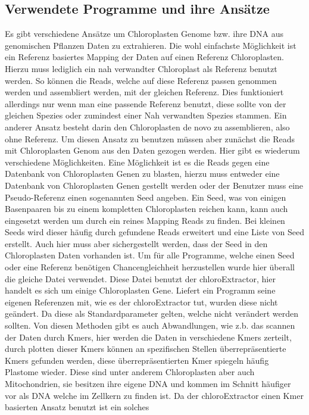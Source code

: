 \documentclass{scrartcl}
\begin{document}
\subsection{Verwendete Programme und ihre Ansätze}
\label{sec-2-5}
Es gibt verschiedene Ansätze um Chloroplasten Genome bzw. ihre DNA aus genomischen Pflanzen Daten zu extrahieren. Die wohl einfachste Möglichkeit ist ein Referenz basiertes
Mapping der Daten auf einen Referenz Chloroplasten. Hierzu muss lediglich ein nah verwandter Chloroplast als Referenz benutzt werden. So können die Reads, welche auf diese Referenz
passen genommen werden und assembliert werden, mit der gleichen Referenz. Dies funktioniert allerdings nur wenn man eine passende Referenz benutzt, diese sollte von der gleichen Spezies oder
zumindest einer Nah verwandten Spezies stammen. Ein anderer Ansatz besteht darin den Chloroplasten de novo zu assemblieren, also ohne Referenz. Um diesen Ansatz zu benutzen müssen
aber zunächst die Reads mit Chloroplasten Genom aus den Daten gezogen werden. Hier gibt es wiederum verschiedene Möglichkeiten. Eine Möglichkeit ist es die Reads gegen eine Datenbank
von Chloroplasten Genen zu blasten, hierzu muss entweder eine Datenbank von Chloroplasten Genen gestellt werden oder der Benutzer muss eine Pseudo-Referenz einen sogenannten Seed angeben.
Ein Seed, was von einigen Basenpaaren bis zu einem kompletten Chloroplasten reichen kann, kann auch eingesetzt werden um durch ein reines Mapping Reads zu finden. Bei kleinen Seeds wird dieser
häufig durch gefundene Reads erweitert und eine Liste von Seed erstellt. Auch hier muss aber sichergestellt werden, dass der Seed in den Chloroplasten Daten vorhanden ist.
Um für alle Programme, welche einen Seed oder eine Referenz benötigen Chancengleichheit herzustellen wurde hier überall die gleiche Datei verwendet. Diese Datei benutzt der chloroExtractor, 
hier handelt es sich um einige Chloroplasten Gene. Liefert ein Programm seine eigenen Referenzen mit, wie es der chloroExtractor tut, wurden diese nicht geändert. Da diese als Standardparameter 
gelten, welche nicht verändert werden sollten.
Von diesen Methoden gibt es auch Abwandlungen, wie z.b. das scannen der Daten durch Kmers, hier werden die Daten in verschiedene Kmers zerteilt, durch plotten dieser Kmers können
an spezifischen Stellen überrepräsentierte Kmers gefunden werden, diese überrepräsentierten Kmer spiegeln häufig Plastome wieder. Diese sind unter anderem Chloroplasten aber auch
Mitochondrien, sie besitzen ihre eigene DNA und kommen im Schnitt häufiger vor als DNA welche im Zellkern zu finden ist. Da der chloroExtractor einen Kmer basierten Ansatz benutzt ist ein solches
\end{document}
